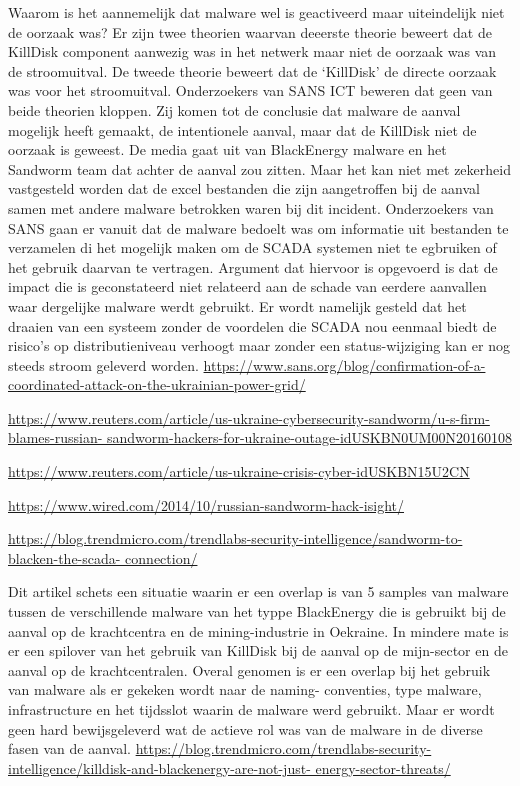 		Waarom is het aannemelijk dat malware wel is geactiveerd maar uiteindelijk niet de oorzaak was?
		Er zijn twee theorien waarvan deeerste theorie beweert dat de KillDisk component aanwezig was in
		het netwerk maar niet de oorzaak was van de stroomuitval. De tweede theorie beweert dat de
		‘KillDisk’ de directe oorzaak was voor het stroomuitval. Onderzoekers van SANS ICT beweren dat
		geen van beide theorien kloppen. Zij komen tot de conclusie dat malware de aanval mogelijk heeft
		gemaakt, de intentionele aanval, maar dat de KillDisk niet de oorzaak is geweest. De media gaat uit
		van BlackEnergy malware en het Sandworm team dat achter de aanval zou zitten. Maar het kan niet
		met zekerheid vastgesteld worden dat de excel bestanden die zijn aangetroffen bij de aanval samen
		met andere malware betrokken waren bij dit incident. Onderzoekers van SANS gaan er vanuit dat de
		malware bedoelt was om informatie uit bestanden te verzamelen di het mogelijk maken om de
		SCADA systemen niet te egbruiken of het gebruik daarvan te vertragen. Argument dat hiervoor is
		opgevoerd is dat de impact die is geconstateerd niet relateerd aan de schade van eerdere aanvallen
		waar dergelijke malware werdt gebruikt. Er wordt namelijk gesteld dat het draaien van een systeem
		zonder de voordelen die SCADA nou eenmaal biedt de risico’s op distributieniveau verhoogt maar
		zonder een status-wijziging kan er nog steeds stroom geleverd worden.
		\url{https://www.sans.org/blog/confirmation-of-a-coordinated-attack-on-the-ukrainian-power-grid/}
		
		\url{https://www.reuters.com/article/us-ukraine-cybersecurity-sandworm/u-s-firm-blames-russian-
			sandworm-hackers-for-ukraine-outage-idUSKBN0UM00N20160108}
		
		\url{	https://www.reuters.com/article/us-ukraine-crisis-cyber-idUSKBN15U2CN}
	
		\url{https://www.wired.com/2014/10/russian-sandworm-hack-isight/}
		
		\url{https://blog.trendmicro.com/trendlabs-security-intelligence/sandworm-to-blacken-the-scada-
			connection/}
		
		Dit artikel schets een situatie waarin er een overlap is van 5 samples van malware tussen de
		verschillende malware van het typpe BlackEnergy die is gebruikt bij de aanval op de krachtcentra en
		de mining-industrie in Oekraine.
		In mindere mate is er een spilover van het gebruik van KillDisk bij de aanval op de mijn-sector en de
		aanval op de krachtcentralen.
		Overal genomen is er een overlap bij het gebruik van malware als er gekeken wordt naar de naming-
		conventies, type malware, infrastructure en het tijdsslot waarin de malware werd gebruikt. Maar er
		wordt geen hard bewijsgeleverd wat de actieve rol was van de malware in de diverse fasen van de
		aanval.
		\url{https://blog.trendmicro.com/trendlabs-security-intelligence/killdisk-and-blackenergy-are-not-just-
			energy-sector-threats/}
		

